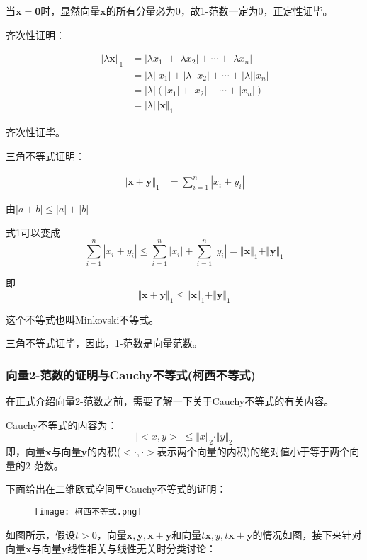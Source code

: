 \documentclass[12pt, a4paper, oneside, UTF8]{ctexbook}
\begin{document}
当$\boldsymbol{x=0}$时，显然向量$\boldsymbol{x}$的所有分量必为0，故1-范数一定为0，正定性证毕。

\noindent
齐次性证明：

\[
\begin{aligned}
    \Vert \lambda \boldsymbol{x}\Vert_1&=|\lambda x_1|+|\lambda x_2|+\cdots+|\lambda x_n|\\
    &=|\lambda||x_1|+|\lambda||x_2|+\cdots+|\lambda||x_n|\\
    &=|\lambda|(|x_1|+|x_2|+\cdots+|x_n|)\\
    &=|\lambda|\Vert \boldsymbol{x}\Vert_1
\end{aligned}
\]

齐次性证毕。

\noindent
三角不等式证明：

\[
\begin{aligned}
    \Vert \boldsymbol{x+y}\Vert_1&=\sum_{i=1}^n|x_i+y_i|
\end{aligned}\tag{1}
\]

由$|a+b|\leq |a|+|b|$

式1可以变成\[
\sum_{i=1}^{n}|x_i+y_i|\leq\sum_{i=1}^n|x_i|+\sum_{i=1}^n|y_i|=\Vert \boldsymbol{x}\Vert_1+\Vert\boldsymbol{y}\Vert_1
\]

即
\[
\Vert \boldsymbol{x+y}\Vert_1\leq \Vert \boldsymbol{x}\Vert_1+\Vert\boldsymbol{y}\Vert_1
\]

这个不等式也叫Minkovski不等式。

三角不等式证毕，因此，1-范数是向量范数。

\subsubsection{向量2-范数的证明与Cauchy不等式(柯西不等式)}
在正式介绍向量2-范数之前，需要了解一下关于Cauchy不等式的有关内容。

Cauchy不等式的内容为：
\[|<x,y>|\leq \Vert x\Vert_2\cdot\Vert y\Vert_2\]
即，向量$\boldsymbol{x}$与向量$\boldsymbol{y}$的内积($<\cdot, \cdot>$表示两个向量的内积)的绝对值小于等于两个向量的2-范数。

下面给出在二维欧式空间里Cauchy不等式的证明：

\begin{figure}[h!]
    \centering
    \texttt{[image: 柯西不等式.png]}
\end{figure}

如图所示，假设$t>0$，向量$\boldsymbol{x,y,x+y}$和向量$t\boldsymbol{x},y,t\boldsymbol{x+y}$的情况如图，接下来针对向量$\boldsymbol{x}$与向量$\boldsymbol{y}$线性相关与线性无关时分类讨论：
\end{document}
